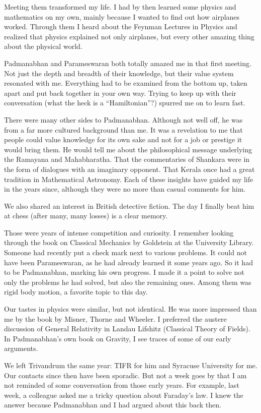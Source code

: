 \documentclass[prd, preprint, longbibliography, 11pt]{revtex4-1}
\begin{document}
Meeting them transformed my life. I had by then learned some physics and mathematics on my own, mainly because I wanted to find out how airplanes worked. Through them I heard about the Feynman Lectures in Physics and realized that physics explained not only airplanes, but every other amazing thing about the physical world.

Padmanabhan  and Parameswaran both totally amazed me  in that first meeting. Not just the depth and breadth of their knowledge, but their value system resonated with me. Everything had to be examined from the bottom up, taken apart and put back together in your own way. Trying to keep up with their conversation (what the heck is a “Hamiltonian”?) spurred me on to learn fast.

There were many other sides to Padmanabhan. Although not well off, he was from a far more  cultured background than me. It was a revelation to me that people could value knowledge for its own sake and not for a job or prestige it would bring them. He would tell me about the philosophical message underlying the Ramayana and Mahabharatha. That the commentaries of Shankara were in the form of dialogues with an imaginary opponent. That Kerala once had a great tradition in Mathematical Astronomy. Each of these insights have guided my life in the years since, although they were no more than casual comments for him.

We also shared an  interest in British detective fiction. The day I finally beat him at chess (after many, many losses) is a clear memory.

Those were years of intense competition and curiosity. I remember looking through the book on Classical Mechanics by Goldstein at the University Library. Someone had recently put a check mark next to various problems. It could not have been Parameswaran, as he had already learned it some years ago. So it had to be Padmanabhan, marking his own progress. I made it a point to solve not only the problems he had solved, but also the remaining ones. Among them was rigid body motion, a favorite topic to this day.

Our tastes in physics were similar, but not identical. He was more impressed than me by the   book by Misner, Thorne and Wheeler. I preferred the austere discussion of General Relativity in Landau Lifshitz (Classical Theory of Fields). In Padmanabhan's own book on Gravity, I see traces of some of our early arguments.

We left Trivandrum the same year: TIFR for him and Syracuse University for me. Our contacts since then have been sporadic. But not a week goes by that I am not reminded of some conversation from those early years. For example, last week, a colleague asked me a tricky question about Faraday's law. I knew the answer because Padmanabhan and I had argued about this back then.
\end{document}
